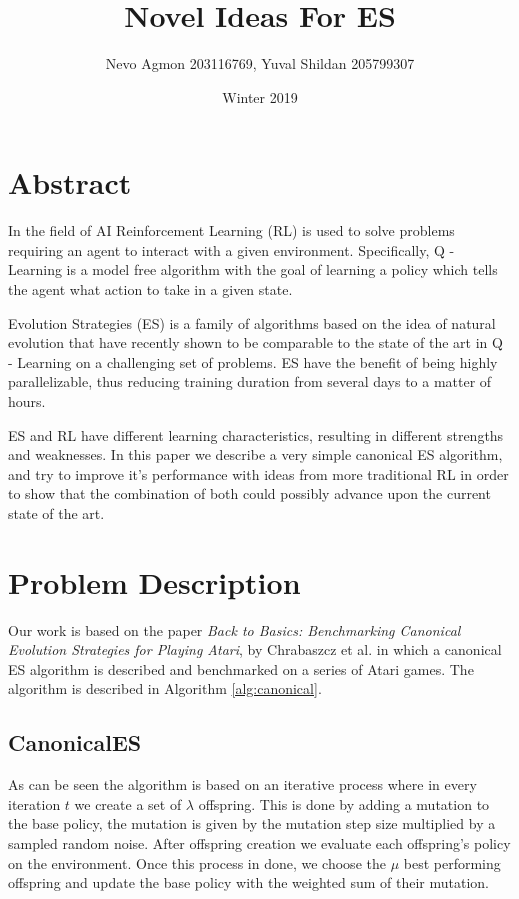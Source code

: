 \documentclass[11 pt, twocolumn]{article}
\title{Novel Ideas For ES}
\author{Nevo Agmon 203116769, Yuval Shildan 205799307}
\date{Winter 2019}
\begin{document}
\maketitle
\section{Abstract}
In the field of AI Reinforcement Learning (RL) is used to solve problems requiring an agent to interact with a given environment. Specifically, Q - Learning is a model free algorithm with the goal of learning a policy which tells the agent what action to take in a given state.

Evolution Strategies (ES) is a family of algorithms based on the idea of natural evolution that have recently shown to be comparable to the state of the art in Q - Learning on a challenging set of problems. ES have the benefit of being highly parallelizable, thus reducing training duration from several days to a matter of hours.

ES and RL have different learning characteristics, resulting in different strengths and weaknesses. In this paper we describe a very simple canonical ES algorithm, and try to improve it's performance with ideas from more traditional RL in order to show that the combination of both could possibly advance upon the current state of the art.


\section{Problem Description}
Our work is based on the paper \emph{Back to Basics: Benchmarking Canonical Evolution Strategies for  Playing Atari}, by Chrabaszcz et al. \cite{canonical} in which a canonical ES algorithm is described and benchmarked on a series of Atari games. The algorithm is described in Algorithm \ref{alg:canonical}.

\subsection{CanonicalES}
As can be seen the algorithm is based on an iterative process where in every iteration $t$ we create a set of $\lambda$ offspring. This is done by adding a mutation to the base policy, the mutation is given by the mutation step size multiplied by a sampled random noise. After offspring creation we evaluate each offspring's policy on the environment. Once this process in done, we choose the $\mu$ best performing offspring and update the base policy with the weighted sum of their mutation.
\end{document}
